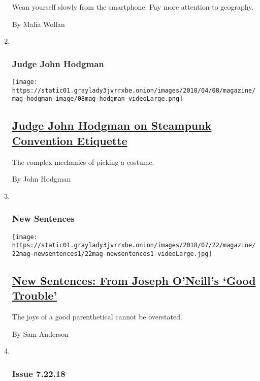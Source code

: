 \begin{enumerate}
  Wean yourself slowly from the smartphone. Pay more attention to
  geography.

  By Malia Wollan
\item ~
  \hypertarget{judge-john-hodgman}{%
  \subsubsection{Judge John Hodgman}\label{judge-john-hodgman}}

  \texttt{[image: https://static01.graylady3jvrrxbe.onion/images/2018/04/08/magazine/mag-hodgman-image/08mag-hodgman-videoLarge.png]}

  \hypertarget{judge-john-hodgman-on-steampunk-convention-etiquette}{%
  \subsection{\texorpdfstring{\href{/2018/07/19/magazine/judge-john-hodgman-on-steampunk-convention-etiquette.html}{Judge
  John Hodgman on Steampunk Convention
  Etiquette}}{Judge John Hodgman on Steampunk Convention Etiquette}}\label{judge-john-hodgman-on-steampunk-convention-etiquette}}

  The complex mechanics of picking a costume.

  By John Hodgman
\item ~
  \hypertarget{new-sentences}{%
  \subsubsection{New Sentences}\label{new-sentences}}

  \texttt{[image: https://static01.graylady3jvrrxbe.onion/images/2018/07/22/magazine/22mag-newsentences1/22mag-newsentences1-videoLarge.jpg]}

  \hypertarget{new-sentences-from-joseph-oneills-good-trouble}{%
  \subsection{\texorpdfstring{\href{/2018/07/18/magazine/new-sentences-from-joseph-oneills-good-trouble.html}{New
  Sentences: From Joseph O'Neill's `Good
  Trouble'}}{New Sentences: From Joseph O'Neill's `Good Trouble'}}\label{new-sentences-from-joseph-oneills-good-trouble}}

  The joys of a good parenthetical cannot be overstated.

  By Sam Anderson
\item ~
  \hypertarget{issue-72218}{%
  \subsubsection{Issue 7.22.18}\label{issue-72218}}


\end{enumerate}
